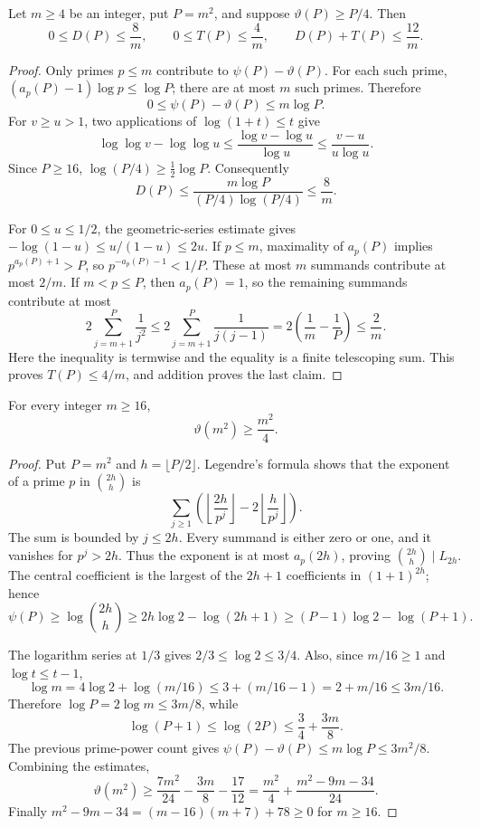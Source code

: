 \begin{lemma}
Let $m\ge4$ be an integer, put $P=m^2$, and suppose
$\vartheta(P)\ge P/4$. Then
\[
 0\le D(P)\le\frac8m,\qquad
 0\le T(P)\le\frac4m,
 \qquad
 D(P)+T(P)\le\frac{12}m.
\]
\end{lemma}
\begin{proof}
Only primes $p\le m$ contribute to $\psi(P)-\vartheta(P)$.
For each such prime, $(a_p(P)-1)\log p\le\log P$; there are at most
$m$ such primes. Therefore
\[
 0\le\psi(P)-\vartheta(P)\le m\log P.
\]
For $v\ge u>1$, two applications of $\log(1+t)\le t$ give
\[
 \log\log v-\log\log u
 \le\frac{\log v-\log u}{\log u}
 \le\frac{v-u}{u\log u}.
\]
Since $P\ge16$,
$\log(P/4)\ge\tfrac12\log P$. Consequently
\[
 D(P)\le\frac{m\log P}{(P/4)\log(P/4)}\le\frac8m.
\]

For $0\le u\le1/2$, the geometric-series estimate gives
$-\log(1-u)\le u/(1-u)\le2u$.
If $p\le m$, maximality of $a_p(P)$ implies $p^{a_p(P)+1}>P$, so
$p^{-a_p(P)-1}<1/P$. These at most $m$ summands contribute at most $2/m$.
If $m<p\le P$, then $a_p(P)=1$, so the remaining summands contribute at most
\[
 2\sum_{j=m+1}^{P}\frac1{j^2}
 \le2\sum_{j=m+1}^{P}\frac1{j(j-1)}
 =2\left(\frac1m-\frac1P\right)\le\frac2m.
\]
Here the inequality is termwise and the equality is a finite telescoping
sum. This proves $T(P)\le4/m$, and addition proves the last claim.
\end{proof}

\begin{lemma}
For every integer $m\ge16$,
\[
 \vartheta(m^2)\ge\frac{m^2}4.
\]
\end{lemma}
\begin{proof}
Put $P=m^2$ and $h=\lfloor P/2\rfloor$.
Legendre's formula shows that the exponent of a prime $p$ in
$\binom{2h}{h}$ is
\[
 \sum_{j\ge1}\left(\left\lfloor\frac{2h}{p^j}\right\rfloor
       -2\left\lfloor\frac h{p^j}\right\rfloor\right).
\]
The sum is bounded by $j\le2h$. Every summand is either zero or one,
and it vanishes for $p^j>2h$. Thus the exponent is at most
$a_p(2h)$, proving $\binom{2h}{h}\mid L_{2h}$.
The central coefficient is the largest of the $2h+1$ coefficients in
$(1+1)^{2h}$; hence
\[
 \psi(P)\ge\log\binom{2h}{h}
 \ge2h\log2-\log(2h+1)
 \ge(P-1)\log2-\log(P+1).
\]

The logarithm series at $1/3$ gives $2/3\le\log2\le3/4$.
Also, since $m/16\ge1$ and $\log t\le t-1$,
\[
 \log m=4\log2+\log(m/16)
 \le3+(m/16-1)=2+m/16\le3m/16.
\]
Therefore $\log P=2\log m\le3m/8$, while
\[
 \log(P+1)\le\log(2P)\le\frac34+\frac{3m}8.
\]
The previous prime-power count gives
$\psi(P)-\vartheta(P)\le m\log P\le3m^2/8$. Combining the estimates,
\[
 \vartheta(m^2)
 \ge\frac{7m^2}{24}-\frac{3m}8-\frac{17}{12}
 =\frac{m^2}4+\frac{m^2-9m-34}{24}.
\]
Finally $m^2-9m-34=(m-16)(m+7)+78\ge0$ for $m\ge16$.
\end{proof}

